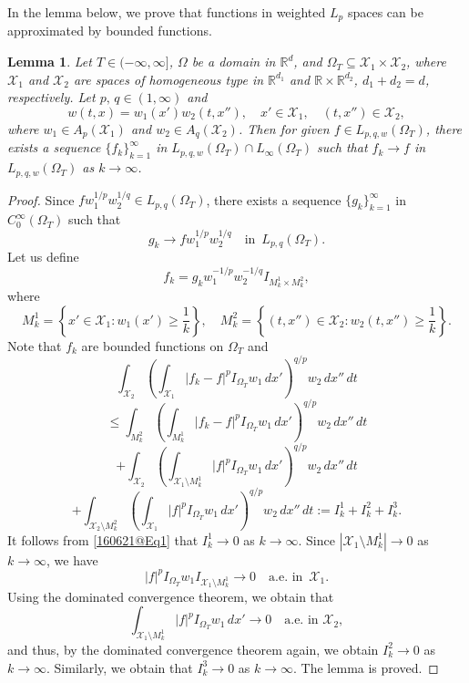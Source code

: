 \documentclass[reqno]{amsart}
\numberwithin{equation}{section}
\theoremstyle{plain}
\newtheorem{lemma}[theorem]{Lemma}
\theoremstyle{definition}
\theoremstyle{remark}
\begin{document}
In the lemma below, we prove that  functions in weighted $L_p$ spaces can be approximated by bounded functions.

\begin{lemma}		\label{160621@lem1}
Let $T\in(-\infty,\infty]$, $\Omega$ be a domain in ${\mathbb{R}}^d$, and $\Omega_T\subseteq {\mathcal{X}}_1\times {\mathcal{X}}_2$, where ${\mathcal{X}}_1$ and ${\mathcal{X}}_2$ are  spaces of homogeneous type  in ${\mathbb{R}}^{d_1}$ and ${\mathbb{R}}\times {\mathbb{R}}^{d_2}$, $d_1+d_2=d$, respectively.
Let $p,\, q\in (1,\infty)$ and 
$$
w(t,x)=w_1(x')w_2(t,x''), \quad x'\in {\mathcal{X}}_1, \quad (t,x'')\in {\mathcal{X}}_2, 
$$
where $w_1\in A_p({\mathcal{X}}_1)$ and $w_2\in A_q({\mathcal{X}}_2)$.
Then  for given $f\in L_{p,q,w}(\Omega_T)$, there exists a sequence $\{f_k\}_{k=1}^\infty$ in $L_{p,q,w}(\Omega_T)\cap L_\infty(\Omega_T)$ such that $f_k\to f$ in $L_{p,q,w}(\Omega_T)$ as $k\to \infty$.
\end{lemma}

\begin{proof}
Since $fw_1^{1/p}w_2^{1/q}\in L_{p,q}(\Omega_T)$, there exists a sequence $\{g_k\}_{k=1}^\infty$ in $C^\infty_0(\Omega_T)$ such that 
\begin{equation}		\label{160621@Eq1}
g_k\to fw_1^{1/p}w_2^{1/q} \quad \text{in }\, L_{p,q}(\Omega_T).
\end{equation}
Let us define 
$$
f_k=g_kw_1^{-1/p}w_2^{-1/q}I_{M^1_k\times M^2_k}, 
$$
where 
$$
M^1_k=\left\{x'\in {\mathcal{X}}_1:w_1(x')\ge \frac{1}{k}\right\}, \quad M^2_k=\left\{(t,x'')\in {\mathcal{X}}_2:w_2(t,x'')\ge \frac{1}{k}\right\}.
$$
Note that $f_k$ are bounded functions on $\Omega_T$ and 
$$
\int_{{\mathcal{X}}_2}\left(\int_{{\mathcal{X}}_1}|f_k-f|^pI_{\Omega_T}w_1\,dx'\right)^{q/p}w_2\,dx''\,dt
$$
$$
\le \int_{M_k^2}\left(\int_{M_k^1}|f_k-f|^pI_{\Omega_T}w_1\,dx'\right)^{q/p}w_2\,dx''\,dt
$$
$$
+ \int_{{\mathcal{X}}_2}\left(\int_{{\mathcal{X}}_1\setminus M_k^1}|f|^pI_{\Omega_T}w_1\,dx'\right)^{q/p}w_2\,dx''\,dt
$$
$$
+ \int_{{\mathcal{X}}_2\setminus M_k^2}\left(\int_{{\mathcal{X}}_1}|f|^pI_{\Omega_T}w_1\,dx'\right)^{q/p}w_2\,dx''\,dt:=I^1_k+I^2_k+I^3_k.
$$
It follows from \eqref{160621@Eq1} that $I_k^1\to 0$ as $k\to \infty$.
Since $|{\mathcal{X}}_1\setminus M_k^1|\to 0$ as $k\to \infty$, we have 
$$
|f|^pI_{\Omega_T} w_1I_{{\mathcal{X}}_1\setminus M^1_k}\to 0 \quad \text{a.e. in }\, {\mathcal{X}}_1.
$$
Using the dominated convergence theorem, we obtain that  
$$
\int_{{\mathcal{X}}_1\setminus M_k^1}|f|^pI_{\Omega_T}w_1\,dx'\to 0 \quad \text{a.e. in  }{\mathcal{X}}_2,
$$
and thus, by the dominated convergence theorem again, we obtain $I^2_k\to 0$ as $k\to \infty$.
Similarly, we obtain that $I_k^3\to 0$ as $k\to \infty$.
The lemma is proved.
\end{proof}
\end{document}
